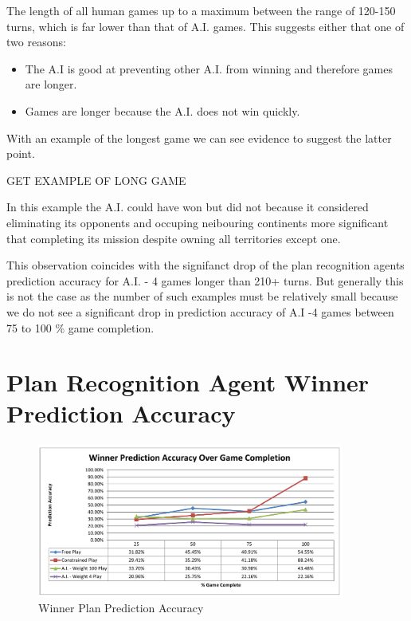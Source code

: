 \documentclass[parskip]{cs4rep}
\begin{document}
The length of all human games up to a maximum between the range of 120-150 turns, which is far lower than that of A.I. games. This suggests either that one of two reasons:

\begin{itemize}
\item
The A.I is good at preventing other A.I. from winning and therefore games are longer.
\item
Games are longer because the A.I. does not win quickly.
\end{itemize}

With an example of the longest game we can see evidence to suggest the latter point.

GET EXAMPLE OF LONG GAME

In this example the A.I. could have won but did not because it considered eliminating its opponents and occuping neibouring continents more significant that completing its mission despite owning all territories except one.

This observation coincides with the signifanct drop of the plan recognition agents prediction accuracy for A.I. - 4 games longer than 210+ turns. But generally this is not the case as the number of such examples must be relatively small because we do not see a significant drop in prediction accuracy of A.I -4 games between 75 to 100 \% game completion.

\newpage

\section{Plan Recognition Agent Winner Prediction Accuracy}

\begin{figure}[h]
\centerline{
\includegraphics[width=0.9\textwidth]{images/winner-game-complete.pdf}
}
\caption{Winner Plan Prediction Accuracy}
\label{fig:winner-pred-accuracy}
\end{figure} 
\end{document}
